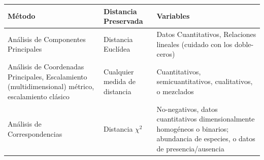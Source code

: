 \documentclass[]{book}
\theoremstyle{definition}
\theoremstyle{definition}
\theoremstyle{definition}
\theoremstyle{remark}
\begin{document}
\begin{longtable}[]{@{}lll@{}}
\toprule
\begin{minipage}[b]{0.35\columnwidth}\raggedright
Método\strut
\end{minipage} & \begin{minipage}[b]{0.11\columnwidth}\raggedright
Distancia Preservada\strut
\end{minipage} & \begin{minipage}[b]{0.45\columnwidth}\raggedright
Variables\strut
\end{minipage}\tabularnewline
\midrule
\endhead
\begin{minipage}[t]{0.35\columnwidth}\raggedright
Análisis de Componentes Principales\strut
\end{minipage} & \begin{minipage}[t]{0.11\columnwidth}\raggedright
Distancia Euclídea\strut
\end{minipage} & \begin{minipage}[t]{0.45\columnwidth}\raggedright
Datos Cuantitativos, Relaciones lineales (cuidado con los
doble-ceros)\strut
\end{minipage}\tabularnewline
\begin{minipage}[t]{0.35\columnwidth}\raggedright
Análisis de Coordenadas Principales, Escalamiento (multidimensional)
métrico, escalamiento clásico\strut
\end{minipage} & \begin{minipage}[t]{0.11\columnwidth}\raggedright
Cualquier medida de distancia\strut
\end{minipage} & \begin{minipage}[t]{0.45\columnwidth}\raggedright
Cuantitativos, semicuantitativos, cualitativos, o mezclados\strut
\end{minipage}\tabularnewline
\begin{minipage}[t]{0.35\columnwidth}\raggedright
Análisis de Correspondencias\strut
\end{minipage} & \begin{minipage}[t]{0.11\columnwidth}\raggedright
Distancia \(\chi^{2}\)\strut
\end{minipage} & \begin{minipage}[t]{0.45\columnwidth}\raggedright
No-negativos, datos cuantitativos dimensionalmente homogéneos o
binarios; abundancia de especies, o datos de presencia/ausencia\strut
\end{minipage}\tabularnewline
\bottomrule
\end{longtable}
\end{document}
